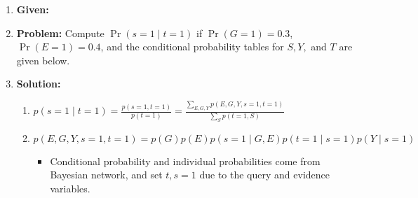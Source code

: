 \begin{example}
    \begin{enumerate}
        \item \textbf{Given:}
        \item \textbf{Problem:} Compute $\Pr(s = 1 \mid t = 1)$ if $\Pr(G = 1) = 0.3$, $\Pr(E = 1) = 0.4$, and the conditional probability tables for $S, Y,$ and $T$ are given below.
        \item \textbf{Solution:}
        \begin{enumerate}
            \item $p(s=1 \mid t=1) = \frac{p(s=1,t=1)}{p(t=1)} = \frac{\sum_{E,G,Y} p(E,G,Y,s=1,t=1)}{\sum_S p(t=1,S)}$ 
            \item $p(E,G,Y,s=1,t=1) = p(G) p(E) p(s=1 \mid G, E) p(t=1 \mid s = 1) p(Y \mid s = 1)$
            \begin{itemize}
                \item Conditional probability and individual probabilities come from Bayesian network, and set $t,s=1$ due to the query and evidence variables.
            \end{itemize}
        \end{enumerate}
    \end{enumerate}


\end{example}
